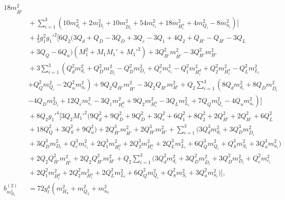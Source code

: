 \documentclass[preprint,amsmath,amssymb,aps,superscriptaddress,prd,
showpacs,floatfix,nofootinbib]{revtex4-1}
\begin{document}
\begin{subequations}
\begin{align}
18 m_{\overline{H'}}^2 \nonumber \\
& {} + \sum_{i=1}^3 \left ( 10 m_{d_i}^2 + 2 m_{D_i}^2 +
10 m_{\overline{D}_i}^2 + 54 m_{e_i}^2 + 18 m_{H_i^u}^2 + 4 m_{Q_i}^2 -
8 m_{u_i}^2 \right ) \bigg ] \nonumber \\
& {} + \frac{4}{5} g_1^2 g_1'^2 \bigg [ 6 Q_2 \big ( 3 Q_d + Q_{\overline{D}}
- 3 Q_D + 3 Q_e - 3 Q_1 + 4 Q_2 + Q_{\overline{H'}} - Q_{H'} - 3 Q_L
\nonumber \\
& {} + 3 Q_Q - 6 Q_u \big ) \left ( M_1^2 + M_1 M_1' + M_1'^2 \right ) +
3 Q_{\overline{H'}}^2 m_{\overline{H'}}^2 - 3 Q_{H'}^2 m_{H'}^2 \nonumber \\
& {} + 3 \sum_{i=1}^3 \left ( Q_d^2 m_{d_i}^2 +
Q_{\overline{D}}^2 m_{\overline{D}_i}^2 - Q_D^2 m_{D_i}^2 + Q_e^2 m_{e_i}^2
- Q_1^2 m_{H_i^d}^2 + Q_2^2 m_{H_i^u}^2 - Q_L^2 m_{L_i}^2 \right .
\nonumber \\
& {} \left . + Q_Q^2 m_{Q_i}^2 - 2 Q_u^2 m_{u_i}^2 \right ) +
9 Q_2 Q_{\overline{H'}} m_{\overline{H'}}^2 - 3 Q_2 Q_{H'} m_{H'}^2 +
Q_2 \sum_{i=1}^3 \left ( 8 Q_d m_{d_i}^2 +
8 Q_{\overline{D}} m_{\overline{D}_i}^2 \right . \nonumber \\
& {} \left . - 4 Q_D m_{D_i}^2 + 12 Q_e m_{e_i}^2 - 3 Q_1 m_{H_i^d}^2 +
9 Q_2 m_{H_i^u}^2 - 3 Q_L m_{L_i}^2 + 7 Q_Q m_{Q_i}^2 - 4 Q_u m_{u_i}^2
\right ) \bigg ] \nonumber \\
& {} + 8 Q_2 g_1'^4 \bigg [ 3 Q_2 M_1'^2 \big ( 9 Q_d^2 +
9 Q_{\overline{D}}^2 + 9 Q_D^2 + 3 Q_e^2 + 6 Q_1^2 + 8 Q_2^2 +
2 Q_{\overline{H'}}^2 + 2 Q_{H'}^2 + 6 Q_L^2 \nonumber \\
& {} + 18 Q_Q^2 + 3 Q_S^2 + 9 Q_u^2 \big ) +
2 Q_{\overline{H'}}^3 m_{\overline{H'}}^2 + 2 Q_{H'}^3 m_{H'}^2 +
\sum_{i=1}^3 \big ( 3 Q_d^3 m_{d_i}^2 +
3 Q_{\overline{D}}^3 m_{\overline{D}_i}^2 \nonumber \\
& {} + 3 Q_D^3 m_{D_i}^2 + Q_e^3 m_{e_i}^2 + 2 Q_1^3 m_{H_i^d}^2 +
2 Q_2^3 m_{H_i^u}^2 + 2 Q_L^3 m_{L_i}^2 + 6 Q_Q^3 m_{Q_i}^2 + Q_S^3 m_{S_i}^2
+ 3 Q_u^3 m_{u_i}^2 \big ) \nonumber \\
& {} + 2 Q_2 Q_{\overline{H'}}^2 m_{\overline{H'}}^2 +
2 Q_2 Q_{H'}^2 m_{H'}^2 + Q_2 \sum_{i=1}^3 \big ( 3 Q_d^2 m_{d_i}^2 +
3 Q_{\overline{D}}^2 m_{\overline{D}_i}^2 + 3 Q_D^2 m_{D_i}^2 +
Q_e^2 m_{e_i}^2 \nonumber \\
& {} + 2 Q_1^2 m_{H_i^d}^2 + 2 Q_2^2 m_{H_i^u}^2 + 2 Q_L^2 m_{L_i}^2 +
6 Q_Q^2 m_{Q_i}^2 + Q_S^2 m_{S_i}^2 + 3 Q_u^2 m_{u_i}^2 \big ) \bigg ] ,
\label{eq:USSMmHu2BetaTwoLoop} \\
b_{m_{H_u}^2}^{(2)} &= 72 y_t^4 \left ( m_{H_u}^2 + m_{Q_3}^2 + m_{u_3}^2

\end{align}
\end{subequations}
\end{document}
